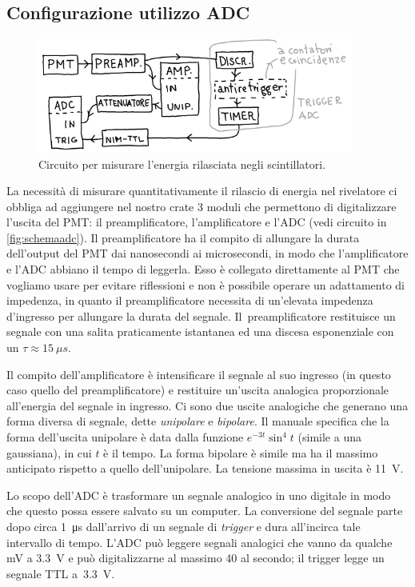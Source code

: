
\subsection{Configurazione utilizzo ADC}

\begin{figure}
	\centering
	\includegraphics[width=28em]{schemaadc}
	\caption{\label{fig:schemaadc}
	Circuito per misurare l'energia rilasciata negli scintillatori.}
\end{figure}

La necessità di misurare quantitativamente il rilascio di energia nel rivelatore ci obbliga ad aggiungere nel nostro crate 3 moduli che permettono di digitalizzare l'uscita del PMT: il preamplificatore, l'amplificatore e l'ADC
(vedi circuito in \autoref{fig:schemaadc}).
Il preamplificatore ha il compito di allungare la durata dell'output del PMT dai nanosecondi ai microsecondi, in modo che l'amplificatore e l'ADC abbiano il tempo di leggerla. Esso è collegato direttamente al PMT che vogliamo usare per evitare riflessioni e non è possibile operare un adattamento di impedenza, in quanto il preamplificatore necessita di un'elevata impedenza d'ingresso per allungare la durata del segnale. 
Il~preamplificatore restituisce un segnale con una salita praticamente istantanea
ed una discesa esponenziale con un $\tau\approx\SI{15}{\mu s}$.

Il compito dell'amplificatore è intensificare il segnale al suo ingresso
(in questo caso quello del preamplificatore)
e restituire un'uscita analogica proporzionale all'energia del segnale in ingresso.
Ci sono due uscite analogiche che generano una forma diversa di segnale,
dette \emph{unipolare} e \emph{bipolare}.
Il manuale specifica che la forma dell'uscita unipolare
è data dalla funzione $e^{-3t}\sin^4{t}$ (simile a una gaussiana), in cui $t$ è il tempo.
La forma bipolare è simile ma ha il massimo anticipato rispetto a quello dell'unipolare.
La tensione massima in uscita è \SI{11}{V}.

Lo scopo dell'ADC è trasformare un segnale analogico in uno digitale
in modo che questo possa essere salvato su un computer.  
La conversione del segnale parte dopo circa \SI{1}{\micro s} dall'arrivo di un segnale di \emph{trigger} e dura all'incirca tale intervallo di tempo. L'ADC può leggere segnali analogici che vanno da qualche \si{mV} a \SI{3.3}{V} e può digitalizzarne al massimo 40 al secondo;
il trigger legge un segnale TTL a~\SI{3.3}{V}.

